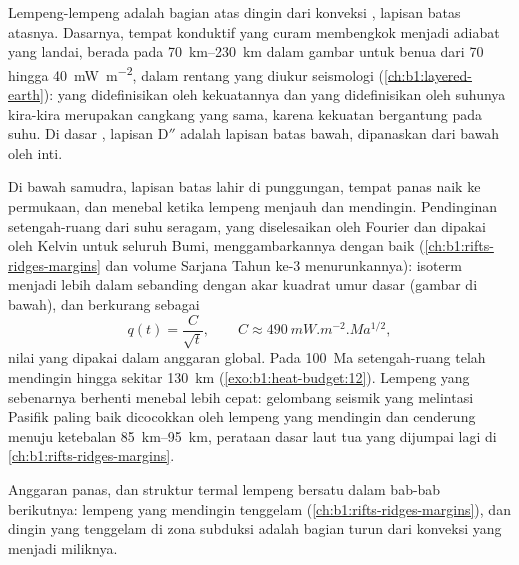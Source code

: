 Lempeng-lempeng adalah bagian atas dingin dari konveksi , lapisan batas atasnya. Dasarnya, tempat  konduktif yang curam membengkok menjadi adiabat yang landai, berada pada \qtyrange{70}{230}{km} dalam gambar  untuk  benua dari 70 hingga \qty{40}{mW.m^{-2}}, dalam rentang yang diukur seismologi (\cref{ch:b1:layered-earth}):  yang didefinisikan oleh kekuatannya dan  yang didefinisikan oleh suhunya kira-kira merupakan cangkang yang sama, karena kekuatan bergantung pada suhu. Di dasar , lapisan D$''$ adalah lapisan batas bawah, dipanaskan dari bawah oleh inti.

Di bawah samudra, lapisan batas lahir di punggungan, tempat  panas naik ke permukaan, dan menebal ketika lempeng menjauh dan mendingin. Pendinginan setengah-ruang dari suhu seragam, yang diselesaikan oleh Fourier dan dipakai oleh Kelvin untuk seluruh Bumi, menggambarkannya dengan baik (\cref{ch:b1:rifts-ridges-margins} dan volume Sarjana Tahun ke-3 menurunkannya): isoterm menjadi lebih dalam sebanding dengan akar kuadrat umur dasar (gambar di bawah), dan  berkurang sebagai
\[
  q(t) = \frac{C}{\sqrt t}, \qquad C \approx \qty{490}{mW.m^{-2}.Ma^{1/2}},
\]
nilai yang dipakai dalam anggaran global. %
Pada \qty{100}{Ma} setengah-ruang telah mendingin hingga sekitar \qty{130}{km} (\cref{exo:b1:heat-budget:12}). Lempeng yang sebenarnya berhenti menebal lebih cepat: gelombang seismik yang melintasi Pasifik paling baik dicocokkan oleh lempeng yang mendingin dan cenderung menuju ketebalan \qtyrange{85}{95}{km}, perataan dasar laut tua yang dijumpai lagi di \cref{ch:b1:rifts-ridges-margins}.

Anggaran panas,  dan struktur termal lempeng bersatu dalam bab-bab berikutnya: lempeng yang mendingin tenggelam (\cref{ch:b1:rifts-ridges-margins}), dan  dingin yang tenggelam di zona subduksi adalah bagian turun dari konveksi yang menjadi miliknya.

